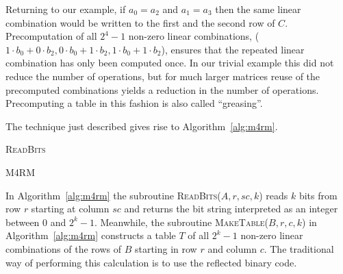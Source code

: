 Returning to our example, if $a_0 = a_2$ and $a_1 = a_3$ then the same linear combination would be written to the first and the second row of $C$.
Precomputation of all $2^4-1$ non-zero linear combinations, ($1\cdot b_0+ 0\cdot b_2,0\cdot b_0+ 1\cdot b_2,1\cdot b_0+ 1\cdot b_2$), ensures that the
repeated linear combination has only been computed once. In our trivial example this did not reduce the number of operations, but for much
larger matrices reuse of the precomputed combinations yields a reduction in the number of operations. Precomputing a table in this fashion is also called ``greasing''.

The technique just described gives rise to Algorithm~\ref{alg:m4rm}.

\begin{algorithm}[H]

\caption{\textsc{ReadBits}}
\label{alg:readbits}
\end{algorithm}

\begin{algorithm}[H]

\caption{\textsc{M4RM}}
\label{alg:m4rm}
\end{algorithm}

In Algorithm~\ref{alg:m4rm} the subroutine \textsc{ReadBits}($A, r, sc, k$) reads $k$ bits from row $r$ starting at column $sc$ and returns the bit string interpreted as an integer between $0$ and $2^k-1$. Meanwhile, the subroutine \textsc{MakeTable}($B, r, c, k$) in Algorithm~\ref{alg:m4rm} constructs a table $T$ of all $2^k-1$ non-zero linear combinations of the rows of $B$ starting in row $r$ and column $c$. The traditional way of performing this calculation is to use the reflected binary code.

